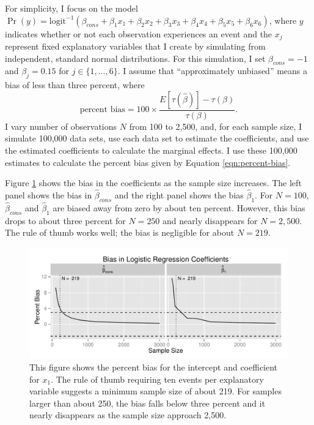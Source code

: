 \documentclass[12pt]{article}
\begin{document}
For simplicity, I focus on the model $\Pr (y) = \text{logit}^{-1}(\beta_{cons} + \beta_1x_1 + \beta_2x_2 + \beta_3x_3 + \beta_4x_4 + \beta_5x_5 + \beta_6x_6)$, where $y$ indicates whether or not each observation experiences an event and the $x_j$ represent fixed explanatory variables that I create by simulating from independent, standard normal distributions. 
For this simulation, I set $\beta_{cons} = -1$ and $\beta_j =  0.15$ for $j \in \{1, ..., 6\}$. 
I assume that ``approximately unbiased'' means a bias of less than three percent, where
\begin{equation}\label{eqn:percent-bias}
\text{percent bias} = 100 \times \frac{E[\tau(\hat{\beta})] - \tau(\beta)}{\tau(\beta)}\text{.}
\end{equation}
I vary number of observations $N$ from 100 to 2,500, and, for each sample size, I simulate 100,000 data sets, use each data set to estimate the coefficients, and use the estimated coefficients to calculate the marginal effects.
I use these 100,000 estimates to calculate the percent bias given by Equation \ref{eqn:percent-bias}.

Figure \ref{fig:bias-coef} shows the bias in the coefficients as the sample size increases. The left panel shows the bias in $\hat{\beta}_{cons}$ and the right panel shows the bias $\hat{\beta}_1$. 
For $N = 100$, $\hat{\beta}_{cons}$ and $\hat{\beta}_1$ are biased away from zero by about ten percent. 
However, this bias drops to about three percent for $N = 250$ and nearly disappears for $N = 2,500$. 
The rule of thumb works well; the bias is negligible for about $N = 219$.

\begin{figure}[h!]
\begin{center}
\includegraphics[scale = 0.7]{figs/bias-coef.pdf}
\caption{This figure shows the percent bias for the intercept and coefficient for $x_1$. 
The rule of thumb requiring ten events per explanatory variable suggests a minimum sample size of about 219. 
For samples larger than about 250, the bias falls below three percent and it nearly disappears as the sample size approach 2,500.}\label{fig:bias-coef}
\end{center}
\end{figure}
\end{document}
